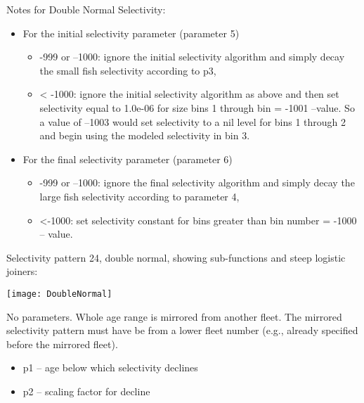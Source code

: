 Notes for Double Normal Selectivity:
	\begin{itemize}
		\item For the initial selectivity parameter (parameter 5)
		\begin{itemize}
			\item -999 or –1000:   ignore the initial selectivity algorithm and simply decay the small fish selectivity according to p3,
			\item < -1000:  ignore the initial selectivity algorithm as above and then set selectivity equal to 1.0e-06 for size bins 1 through bin =  -1001 –value.  So a value of –1003 would set selectivity to a nil level for bins 1 through 2 and begin using the modeled selectivity in bin 3.
		\end{itemize}
		\item For the final selectivity parameter (parameter 6)
		\begin{itemize}
			\item -999 or –1000:   ignore the final selectivity algorithm and simply decay the large fish selectivity according to parameter 4,
			\item <-1000:  set selectivity constant for bins greater than bin number =  -1000 – value.
		\end{itemize}
	\end{itemize}
Selectivity pattern 24, double normal, showing sub-functions and steep logistic joiners:
	\begin{center}
		\texttt{[image: DoubleNormal]}
	\end{center}

No parameters.  Whole age range is mirrored from another fleet. The mirrored selectivity pattern must have be from a lower fleet number (e.g., already specified before the mirrored fleet).

	\begin{itemize}
		\item p1 – age below which selectivity declines
		\item p2 – scaling factor for decline
	\end{itemize}


